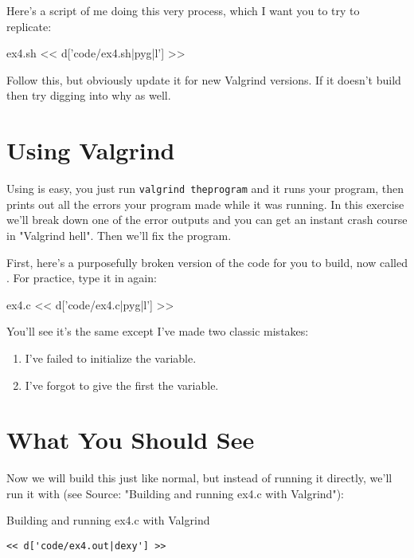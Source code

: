Here's a script of me doing this very process, which I want you to
try to replicate:

\begin{code}{ex4.sh}
<< d['code/ex4.sh|pyg|l'] >>
\end{code}

Follow this, but obviously update it for new Valgrind versions.  If it
doesn't build then try digging into why as well.

\section{Using Valgrind}

Using  is easy, you just run \verb|valgrind theprogram| and
it runs your program, then prints out all the errors your program made while it
was running.  In this exercise we'll break down one of the error outputs and
you can get an instant crash course in "Valgrind hell".  Then we'll fix the
program.

First, here's a purposefully broken version of the  code
for you to build, now called .  For practice, type it
in again:

\begin{code}{ex4.c}
<< d['code/ex4.c|pyg|l'] >>
\end{code}

You'll see it's the same except I've made two classic mistakes:

\begin{enumerate}
\item I've failed to initialize the  variable.
\item I've forgot to give the first  the  variable.
\end{enumerate}

\section{What You Should See}

Now we will build this just like normal, but instead of running it
directly, we'll run it with  (see Source: "Building and running ex4.c with Valgrind"):

\begin{Terminal}{Building and running ex4.c with Valgrind}
\begin{lstlisting}
<< d['code/ex4.out|dexy'] >>
\end{lstlisting}
\end{Terminal}

